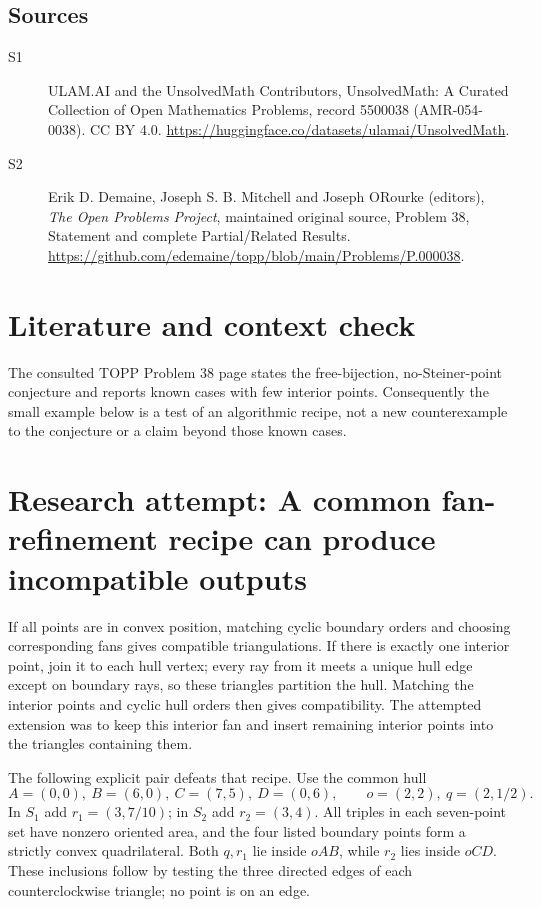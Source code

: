 \documentclass[11pt]{article}
\begin{document}
\subsection{Sources}
\begin{description}
\item[S1] ULAM.AI and the UnsolvedMath Contributors, UnsolvedMath: A Curated Collection of Open Mathematics Problems, record 5500038 (AMR-054-0038). CC BY 4.0. \url{https://huggingface.co/datasets/ulamai/UnsolvedMath}.
\item[S2] Erik D. Demaine, Joseph S. B. Mitchell and Joseph O\textquotesingle Rourke (editors), \emph{The Open Problems Project}, maintained original source, Problem 38, Statement and complete Partial/Related Results. \url{https://github.com/edemaine/topp/blob/main/Problems/P.000038}.
\end{description}
\label{end:5500038}

\section{Literature and context check}
The consulted TOPP Problem 38 page states the free-bijection, no-Steiner-point
conjecture and reports known cases with few interior points. Consequently the
small example below is a test of an algorithmic recipe, not a new counterexample
to the conjecture or a claim beyond those known cases.
\section{Research attempt: A common fan-refinement recipe can produce incompatible outputs}
If all points are in convex position, matching cyclic boundary orders and
choosing corresponding fans gives compatible triangulations. If there is exactly
one interior point, join it to each hull vertex; every ray from it meets a unique
hull edge except on boundary rays, so these triangles partition the hull. Matching
the interior points and cyclic hull orders then gives compatibility. The attempted
extension was to keep this interior fan and insert remaining interior points into
the triangles containing them.

The following explicit pair defeats that recipe. Use the common hull
\[
 A=(0,0),\ B=(6,0),\ C=(7,5),\ D=(0,6),
 \qquad o=(2,2),\ q=(2,1/2).
\]
In $S_1$ add $r_1=(3,7/10)$; in $S_2$ add $r_2=(3,4)$.
All triples in each seven-point set have nonzero oriented area, and the four
listed boundary points form a strictly convex quadrilateral. Both $q,r_1$ lie
inside $oAB$, while $r_2$ lies inside $oCD$. These inclusions follow by testing
the three directed edges of each counterclockwise triangle; no point is on an edge.
\end{document}
